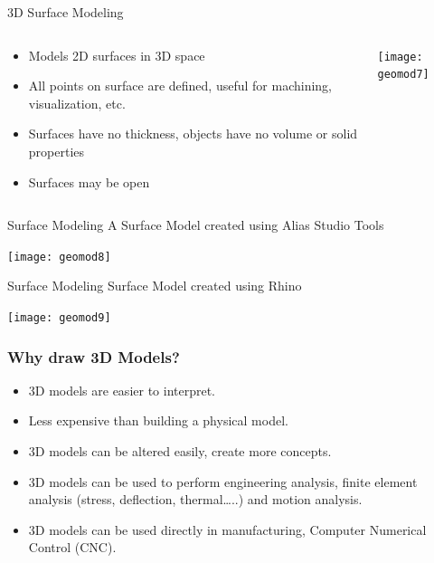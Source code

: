 \begin{frame}[fragile]{3D Surface Modeling}
 \begin{columns}
  \begin{column}{0.55\linewidth}
\begin{itemize}
\item Models 2D surfaces in 3D space
\item All points on surface are defined, useful for machining, visualization, etc.
\item Surfaces have no thickness, objects have no volume or solid properties
\item Surfaces may be open
\end{itemize}
  \end{column}%
  \begin{column}{0.45\linewidth}
			\begin{center}
	\texttt{[image: geomod7]}

			\end{center}
  \end{column}
 \end{columns}
 
\end{frame}

\begin{frame}[fragile]{Surface Modeling}
A Surface Model created using Alias Studio Tools

			\begin{center}
	\texttt{[image: geomod8]}
			\end{center}
\end{frame}

\begin{frame}[fragile]{Surface Modeling}
Surface Model created using Rhino

			\begin{center}
	\texttt{[image: geomod9]}
			\end{center}
\end{frame}


\begin{frame}[fragile]\frametitle{Why draw 3D Models?}
\begin{itemize}
\item 3D models are easier to interpret.
\item Less expensive than building a physical model.
\item 3D models can be altered easily, create more concepts.
\item 3D models can be used to perform engineering analysis, finite element analysis (stress, deflection, thermal…..) and motion analysis.
\item 3D models can be used directly in manufacturing, Computer Numerical Control (CNC).
\end{itemize}

\end{frame}

